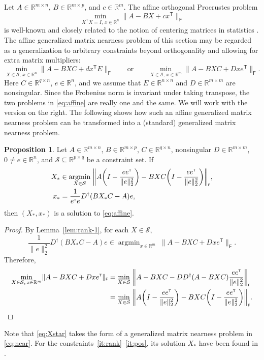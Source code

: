 \documentclass[11pt,reqno]{amsart}
\newcommand{\tp}{{\scriptscriptstyle\mathsf{T}}}
\newcommand{\F}{{\scriptscriptstyle\mathsf{F}}}
\DeclareMathOperator*{\argmin}{argmin}
\theoremstyle{definition}
\newtheorem{proposition}[theorem]{Proposition}
\numberwithin{equation}{section}
\newcommand{\R}{\mathbb{R}}
\begin{document}
Let $A \in \R^{m \times n}$, $B \in \R^{m \times p}$, and $c \in \R^m$. The affine orthogonal Procrustes problem
\[
\min_{X^\tp X = I,\, x\in \R^n} \lVert A- B X + cx^\tp \rVert_\F
\]
is well-known and closely related to the notion of centering matrices in statistics \cite{Marden1995}. The affine generalized matrix nearness problem of this section may be regarded as a generalization to arbitrary constraints beyond orthogonality and allowing for extra matrix multipliers:
\begin{equation}\label{eq:affine}
\min_{X \in \mathcal{S},\, x\in \R^n} \lVert A- B X C + dx^\tp E \rVert_\F \qquad\text{or}\qquad
\min_{X \in \mathcal{S},\, x\in \R^m} \lVert A- B X C + D x e^\tp \rVert_\F.
\end{equation}
Here  $C \in \R^{q \times n}$, $e \in \R^n$, and we assume that $E \in \R^{n \times n}$ and $D \in \R^{m \times m}$ are nonsingular.
Since the Frobenius norm is invariant under taking transpose, the two problems in \eqref{eq:affine} are really one and the same. We will work with the version on the right. The following shows how such an affine generalized matrix nearness problem can be transformed into a (standard) generalized matrix nearness problem.
\begin{proposition}\label{prop:affine}
Let $A \in \R^{m \times n}$, $B \in \R^{m \times p}$, $C \in \R^{q \times n}$, nonsingular $D \in \R^{m \times m}$,  $0 \ne e \in \R^{n}$, and $\mathcal{S} \subseteq \R^{p \times q}$ be a constraint set. If
\begin{align}
X_* &\in \argmin_{X \in \mathcal{S}} \; \biggl\lVert A \biggl(I - \frac{ee^\tp}{\lVert e \rVert_2^2} \biggr) - BXC\biggl(I - \frac{ee^\tp}{\lVert e \rVert_2^2} \biggr) \biggr\rVert_\F, \label{eq:Xstar} \\
x_* &= \frac{1}{e^\tp e} D^\dagger (BX_*C - A) e, \notag
\end{align}
then $(X_*, x_*)$ is a solution to \eqref{eq:affine}.
\end{proposition}
\begin{proof}
By Lemma~\ref{lem:rank-1}, for each $X \in \mathcal{S}$, 
\[
    \frac{1}{\lVert e\rVert_2^2} D^\dagger (BX_*C - A) e \in \argmin_{x\in \R^m} \; \lVert A- B X C + Dx e^\tp \rVert_\F.\]
Therefore, 
\begin{align*}
    \min_{X \in \mathcal{S},\, x\in \R^m} \lVert A- B X C + Dxe^\tp \rVert_\F &= \min_{X \in \mathcal{S}} \; \biggl\lVert A - BXC -  DD^\dagger(A- B X C)\frac{ee^\tp}{\lVert e \rVert_2^2} \biggr\rVert_\F\\
    &= \min_{X \in \mathcal{S}} \; \biggl\lVert A \biggl(I - \frac{ee^\tp}{\lVert e \rVert_2^2} \biggr) - BXC\biggl(I - \frac{ee^\tp}{\lVert e \rVert_2^2} \biggr) \biggr\rVert_\F. \qedhere
\end{align*}
\end{proof}
Note that \eqref{eq:Xstar} takes the form of a generalized matrix nearness problem in \eqref{eq:near}. For the constraints~\ref{it:rank}--\ref{it:pos}, its solution $X_*$ have been found in \cite{li22}.
\end{document}
